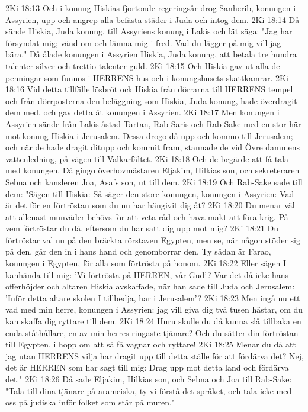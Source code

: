 2Ki 18:13  Och i konung Hiskias fjortonde regeringsår drog Sanherib, konungen i Assyrien, upp och angrep alla befästa städer i Juda och intog dem.
2Ki 18:14  Då sände Hiskia, Juda konung, till Assyriens konung i Lakis och lät säga: "Jag har försyndat mig; vänd om och lämna mig i fred. Vad du lägger på mig vill jag bära." Då ålade konungen i Assyrien Hiskia, Juda konung, att betala tre hundra talenter silver och trettio talenter guld.
2Ki 18:15  Och Hiskia gav ut alla de penningar som funnos i HERRENS hus och i konungshusets skattkamrar.
2Ki 18:16  Vid detta tillfälle lösbröt ock Hiskia från dörrarna till HERRENS tempel och från dörrposterna den beläggning som Hiskia, Juda konung, hade överdragit dem med, och gav detta åt konungen i Assyrien.
2Ki 18:17  Men konungen i Assyrien sände från Lakis åstad Tartan, Rab-Saris och Rab-Sake med en stor här mot konung Hiskia i Jerusalem. Dessa drogo då upp och kommo till Jerusalem; och när de hade dragit ditupp och kommit fram, stannade de vid Övre dammens vattenledning, på vägen till Valkarfältet.
2Ki 18:18  Och de begärde att få tala med konungen. Då gingo överhovmästaren Eljakim, Hilkias son, och sekreteraren Sebna och kansleren Joa, Asafs son, ut till dem.
2Ki 18:19  Och Rab-Sake sade till dem: "Sägen till Hiskia: Så säger den store konungen, konungen i Assyrien: Vad är det för en förtröstan som du nu har hängivit dig åt?
2Ki 18:20  Du menar väl att allenast munväder behövs för att veta råd och hava makt att föra krig. På vem förtröstar du då, eftersom du har satt dig upp mot mig?
2Ki 18:21  Du förtröstar val nu på den bräckta rörstaven Egypten, men se, när någon stöder sig på den, går den in i hans hand och genomborrar den. Ty sådan är Farao, konungen i Egypten, för alla som förtrösta på honom.
2Ki 18:22  Eller sägen I kanhända till mig: 'Vi förtrösta på HERREN, vår Gud'? Var det då icke hans offerhöjder och altaren Hiskia avskaffade, när han sade till Juda och Jerusalem: 'Inför detta altare skolen I tillbedja, har i Jerusalem'?
2Ki 18:23  Men ingå nu ett vad med min herre, konungen i Assyrien: jag vill giva dig två tusen hästar, om du kan skaffa dig ryttare till dem.
2Ki 18:24  Huru skulle du då kunna slå tillbaka en enda ståthållare, en av min herres ringaste tjänare? Och du sätter din förtröstan till Egypten, i hopp om att så få vagnar och ryttare!
2Ki 18:25  Menar du då att jag utan HERRENS vilja har dragit upp till detta ställe för att fördärva det? Nej, det är HERREN som har sagt till mig: Drag upp mot detta land och fördärva det."
2Ki 18:26  Då sade Eljakim, Hilkias son, och Sebna och Joa till Rab-Sake: "Tala till dina tjänare på arameiska, ty vi förstå det språket, och tala icke med oss på judiska inför folket som står på muren."
